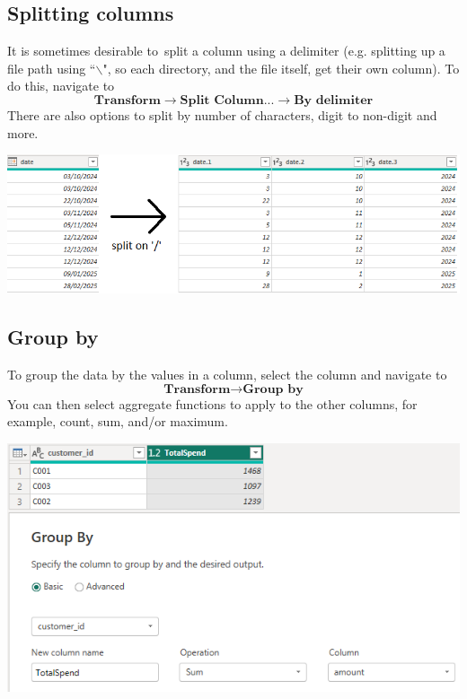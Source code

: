 \documentclass[10pt, openany, twocolumn]{book}
\begin{document}
\subsection*{Splitting columns}

It is sometimes desirable to split a column using a delimiter (e.g. splitting up a file path using ``$\backslash$", so each directory, and the file itself, get their own column). To do this, navigate to
$$\textbf{Transform} \rightarrow \textbf{Split Column...}
\rightarrow  \textbf{By delimiter}$$
There are also options to split by number of characters, digit to non-digit and more.
\begin{center}
    \includegraphics[width = \columnwidth]{images/split_column.png}
\end{center}

\subsection*{Group by}

To group the data by the values in a column, select the column and navigate to
$$\textbf{Transform} \rightarrow \textbf{Group by}$$
You can then select aggregate functions to apply to the other columns, for example, count, sum, and/or maximum.
\begin{center}
    \includegraphics[width = \columnwidth]{images/group_by.png}
\end{center}
\end{document}

